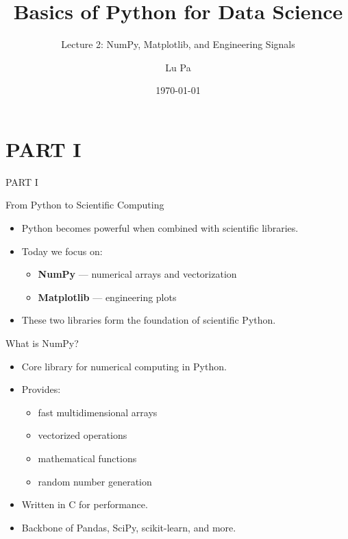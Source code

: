 \documentclass[aspectratio=169]{beamer}
\title{Basics of Python for Data Science}
\subtitle{Lecture 2: NumPy, Matplotlib, and Engineering Signals}
\author{Lu Pa}
\date{\today}
\begin{document}
\begin{frame}
  \titlepage
\end{frame}

\section{PART I}
\begin{frame}[plain]
  \begin{center}
    \vspace{2cm}
    {\color{white}\Huge PART I}
  \end{center}
\end{frame}

\begin{frame}{From Python to Scientific Computing}
  \begin{itemize}
    \item Python becomes powerful when combined with scientific libraries.
    \item Today we focus on:
      \begin{itemize}
        \item \textbf{NumPy} — numerical arrays and vectorization
        \item \textbf{Matplotlib} — engineering plots
      \end{itemize}
    \item These two libraries form the foundation of scientific Python.
  \end{itemize}
\end{frame}

\begin{frame}{What is NumPy?}
  \begin{itemize}
    \item Core library for numerical computing in Python.
    \item Provides:
      \begin{itemize}
        \item fast multidimensional arrays
        \item vectorized operations
        \item mathematical functions
        \item random number generation
      \end{itemize}
    \item Written in C for performance.
    \item Backbone of Pandas, SciPy, scikit-learn, and more.
  \end{itemize}
\end{frame}
\end{document}
